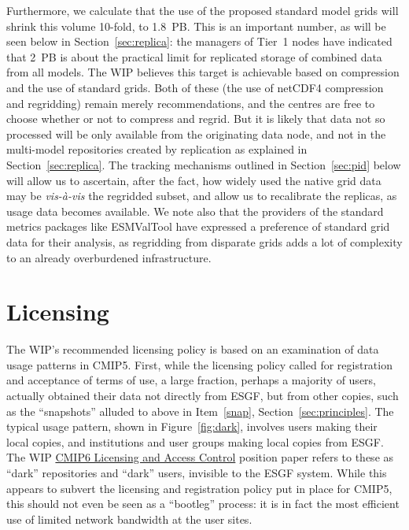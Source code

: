 \documentclass[gmd,manuscript]{copernicus}
\newcommand{\pipref}[1] {\citep{ref:#1}}
\newcommand{\figref}[1] {\mbox{Figure   \ref{fig:#1}}}
\newcommand{\secref}[1] {\mbox{Section  \ref{sec:#1}}}
\begin{document}
Furthermore, we calculate that the use of the proposed standard model
grids will shrink this volume 10-fold, to 1.8~PB. This is an important
number, as will be seen below in \secref{replica}: the managers of
Tier~1 nodes have indicated that 2~PB is about the practical limit for
replicated storage of combined data from all models. The WIP believes
this target is achievable based on compression and the use of standard
grids. Both of these (the use of netCDF4 compression and regridding)
remain merely recommendations, and the centres are free to choose
whether or not to compress and regrid. But it is likely that data not
so processed will be only available from the originating data node,
and not in the multi-model repositories created by replication as
explained in \secref{replica}. The tracking mechanisms outlined in
\secref{pid} below will allow us to ascertain, after the fact, how
widely used the native grid data may be \emph{vis-\`a-vis} the
regridded subset, and allow us to recalibrate the replicas, as usage
data becomes available. We note also that the providers of the
standard metrics packages like ESMValTool \pipref{eyringetal2016} have
expressed a preference of standard grid data for their analysis, as
regridding from disparate grids adds a lot of complexity to an already
overburdened infrastructure.

\section{Licensing}
\label{sec:licensing}

The WIP's recommended licensing policy is based on an examination of
data usage patterns in CMIP5. First, while the licensing policy called
for registration and acceptance of terms of use, a large fraction,
perhaps a majority of users, actually obtained their data not directly
from ESGF, but from other copies, such as the ``snapshots'' alluded to
above in Item~\ref{snap}, \secref{principles}. The typical usage
pattern, shown in \figref{dark}, involves users making their local
copies, and institutions and user groups making local copies from
ESGF. The WIP \href{https://goo.gl/h4HSP1}{CMIP6 Licensing and Access
  Control} position paper refers to these as ``dark'' repositories and
``dark'' users, invisible to the ESGF system. While this appears to
subvert the licensing and registration policy put in place for CMIP5,
this should not even be seen as a ``bootleg'' process: it is in fact
the most efficient use of limited network bandwidth at the user sites.
\end{document}

